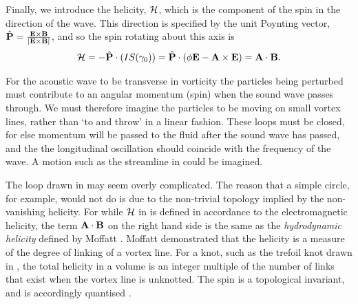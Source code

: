 Finally, we introduce the helicity, ${\cal H}$, which is the component of the spin in the direction of the wave.
This direction is specified by the unit Poynting vector,  $\hat{\mathbf{P}} =\frac{\mathbf{E} \times \mathbf{B}}{\left| \mathbf{E}\times\mathbf{B} \right|}$,
and so the  spin rotating about this axis is 
\begin{align}
  \label{eqn:Helicity}
  {\cal H} = - \hat {\mathbf{P}}\cdot \left( I S(\gamma_0) \right) =  \hat {\mathbf{P}} \cdot \left( \phi \mathbf{E} - \textbf{A} \times\mathbf{E} \right) =  \textbf{A} \cdot \mathbf{B}.
\end{align}

For the acoustic wave to be transverse in vorticity the particles being perturbed must contribute to  an angular momentum (spin) when the sound wave passes through.
We must therefore imagine the particles to be moving on small vortex lines, 
rather than `to and throw' in a linear fashion.
These loops must be closed, for else momentum will be passed to the fluid  after the sound wave has passed,
and the the longitudinal oscillation should coincide with the frequency of the wave. 
A motion such as the streamline in  could be imagined.



The loop drawn in  may seem overly complicated.
The reason that a simple circle, for example, 
would not do is due to the non-trivial topology implied by the non-vanishing helicity.
For while ${\cal H}$ in  is defined in accordance to the electromagnetic helicity,
the term $\textbf{A} \cdot \mathbf{B}$ on the right hand side is the same as the 
{\em hydrodynamic helicity} defined by Moffatt \cite{Moffatt1969}.
Moffatt demonstrated that the helicity is a measure of the degree of linking of a vortex line.
For a knot, such as the trefoil knot drawn in , 
the total helicity in a volume is an integer multiple of the number of links 
that exist when the  vortex line is unknotted.
The spin is a topological invariant, and is accordingly quantised
\cite{Moffatt1969, Moffatt1988, Chechkin1993,  Trueba1996, Trueba2000}.




